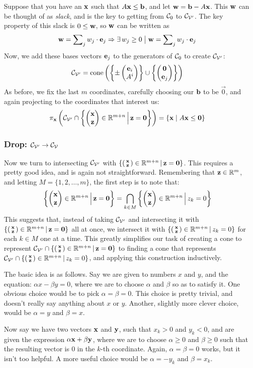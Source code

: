 Suppose that you have an $\x$ such that $A\x \leq \b$, and let $\w = \b - A\x$.  This $\w$ can be thought of as \textit{slack}, and is the key to getting from $\C_0$ to $\CVp$.  The key property of this slack is $0 \leq \w$, so $\w$ can be written as
  \[ \w = \sum\nolimits_j w_j\cdot\e_j 
          \Rightarrow \exists\,w_j \geq 0 \;\big|\; \w = \sum\nolimits_j w_j\cdot\e_j \]
Now, we add these bases vectors $\e_j$ to the generators of $\C_0$ to create $\CVp$:
  \[ \CVp = \cone\left(\left\{\pm\stack{\e_i}{A^i}\right\} \cup 
                 \left\{\stack{\vec{0}}{\e_j}\right\}\right) 
  \]
As before, we fix the last $m$ coordinates, carefully choosing our $\b$ to be $\vec{0}$, and again projecting to the coordinates that interest us:
  \[ \pi_{\x} \left( \CVp \cap \setzeq{\z}{\vec{0}} \right) = 
               \{\x \suchthat A\x \leq \vec{0}\}
  \]

\subsubsection{Drop: $\CVp \to \CV$}
Now we turn to intersecting $\CVp$ with $\smallsetzeq{\z}{\vec{0}}$.  This requires a pretty good idea, and is again not straightforward.  Remembering that $\z \in \R^m$, and letting $M = \{1,2,\dots,m\}$, the first step is to note that:
  \[ \setzeq{\z}{\vec{0}} = 
     \bigcap_{k \in M} \setzeq{z_k}{0} \]
This suggests that, instead of taking $\CVp$ and intersecting it with $\smallsetzeq{\z}{\vec{0}}$ all at once, we intersect it with $\smallsetzeq{z_k}{0}$ for each $k \in M$ one at a time.  This greatly simplifies our task of creating a cone to represent ${\CVp \cap \smallsetzeq{\z}{\vec{0}}}$ to finding a cone that represents ${\CVp \cap \smallsetzeq{z_k}{0}}$, and applying this construction inductively.

The basic idea is as follows.  Say we are given to numbers $x$ and $y$, and the equation: ${\alpha x - \beta y = 0 }$, where we are to choose $\alpha$ and $\beta$ so as to satisfy it.  One obvious choice would be to pick ${\alpha = \beta = 0}$.  This choice is pretty trivial, and doesn't really say anything about $x$ or $y$.  Another, slightly more clever choice, would be $\alpha = y$ and $\beta = x$.  

Now say we have two vectors $\x$ and $\y$, such that $x_k > 0$ and $y_k < 0$, and are given the expression $\alpha \x + \beta \y$, where we are to choose $\alpha \geq 0$ and $\beta \geq 0$ such that the resulting vector is $0$ in the $k$-th coordinate.  Again, $\alpha = \beta = 0$ works, but it isn't too helpful.  A more useful choice would be $\alpha = -y_k$ and $\beta = x_k$.


